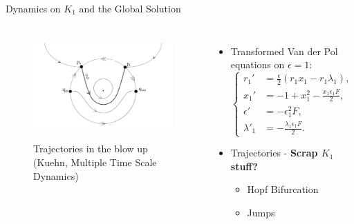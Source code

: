 \documentclass[11pt]{beamer}
\begin{document}
\begin{frame}{Dynamics on $K_1$ and the Global Solution}
\begin{columns}
	\begin{figure}
		\centering
\includegraphics[height=4cm,width=6cm]{Images/pres-cancard}
		\caption{Trajectories in the blow up (Kuehn, Multiple Time Scale Dynamics)}
		
	\end{figure}
	\begin{itemize}
		\item Transformed Van der Pol equations on $ \epsilon=1$:
		\begin{equation*}
		\begin{cases}
			r_1'&=\frac{\epsilon}{2}(r_1x_1-r_1\lambda_1), \\
		x_1'&=-1+x_1^2-\frac{x_1\epsilon_1F}{2},\\
		\epsilon'&=-\epsilon_1^2F,\\
		\lambda'_1&=-\frac{\lambda_1\epsilon_1F}{2}.
		\end{cases}
		\end{equation*}
		\item Trajectories - \textbf{Scrap $ K_1 $ stuff?}
		\begin{itemize}
			\item Hopf Bifurcation
			\item Jumps
		\end{itemize}
		
	\end{itemize}
\end{columns}
\end{frame}
\end{document}

